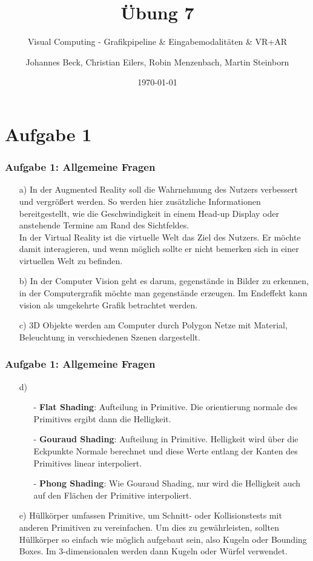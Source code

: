 \documentclass[accentcolor=tud9c,colorbacktitle,inverttitle,landscape,german,presentation,t]{tudbeamer}
\begin{document}
\title{\"Ubung 7}
\subtitle{Visual Computing - Grafikpipeline \& Eingabemodalit\"aten \& VR+AR} %

\author[Johannes Beck, Christian Eilers, Robin Menzenbach, Martin Steinborn]{Johannes Beck, Christian Eilers, Robin Menzenbach, Martin Steinborn}


\date{\today}

\begin{titleframe}
\end{titleframe}

\section{Aufgabe 1}
	\begin{frame}
		\frametitle{Aufgabe 1: Allgemeine Fragen}
		\begin{itemize}
		\item[a)]In der Augmented Reality soll die Wahrnehmung des Nutzers verbessert und vergrößert werden. So werden hier zusätzliche Informationen bereitgestellt, wie die Geschwindigkeit in einem Head-up Display oder anstehende Termine am Rand des Sichtfeldes.\\
In der Virtual Reality ist die virtuelle Welt das Ziel des Nutzers. Er möchte damit interagieren, und wenn möglich sollte er nicht bemerken sich in einer virtuellen Welt zu befinden.
		\item[b)]In der Computer Vision geht es darum, gegenstände in Bilder zu erkennen, in der Computergrafik möchte man gegenstände erzeugen. Im Endeffekt kann vision als umgekehrte Grafik betrachtet werden.
		\item[c)] 3D Objekte werden am Computer durch Polygon Netze mit Material, Beleuchtung in verschiedenen Szenen dargestellt.
		\end{itemize}
	\end{frame}


	\begin{frame}
		\frametitle{Aufgabe 1: Allgemeine Fragen}
		\begin{itemize}
		\item[d)]
		\begin{itemize}
			 \item[-] \textbf{Flat Shading}: Aufteilung in Primitive. Die orientierung normale des Primitives ergibt dann die Helligkeit.
			 \item[-] \textbf{Gouraud Shading}: Aufteilung in Primitive. Helligkeit wird über die Eckpunkte Normale berechnet und diese Werte entlang der Kanten des Primitives linear interpoliert.
			 \item[-] \textbf{Phong Shading}: Wie Gouraud Shading, nur wird die Helligkeit auch auf den Flächen der Primitive interpoliert.
		\end{itemize}
		\item[e)]  Hüllkörper umfassen Primitive, um Schnitt- oder Kollisionstests mit anderen Primitiven zu vereinfachen. Um dies zu gewährleisten, sollten Hüllkörper so einfach wie möglich aufgebaut sein, also Kugeln oder Bounding Boxes. Im 3-dimensionalen werden dann Kugeln oder Würfel verwendet.
		\end{itemize}
	\end{frame}
\end{document}
